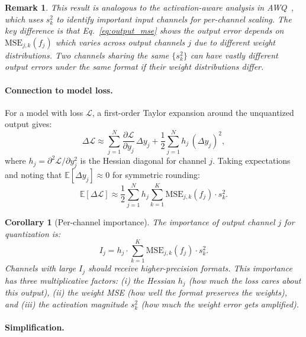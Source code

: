 \documentclass{article}
\newtheorem{corollary}{Corollary}
\newtheorem{remark}{Remark}
\begin{document}
\begin{remark}
This result is analogous to the activation-aware analysis in AWQ~\cite{lin2024awq}, which uses $s_k^2$ to identify important \emph{input} channels for per-channel scaling.
The key difference is that Eq.~\eqref{eq:output_mse} shows the output error depends on $\text{MSE}_{j,k}(f_j)$ which varies across \emph{output} channels $j$ due to different weight distributions.
Two channels sharing the same $\{s_k^2\}$ can have vastly different output errors under the same format if their weight distributions differ.
\end{remark}

\paragraph{Connection to model loss.}
For a model with loss $\mathcal{L}$, a first-order Taylor expansion around the unquantized output gives:
\begin{equation}
\label{eq:loss_expansion}
\Delta\mathcal{L} \approx \sum_{j=1}^N \frac{\partial \mathcal{L}}{\partial y_j}\,\Delta y_j + \frac{1}{2}\sum_{j=1}^N h_j\,(\Delta y_j)^2,
\end{equation}
where $h_j = \partial^2\mathcal{L}/\partial y_j^2$ is the Hessian diagonal for channel $j$.
Taking expectations and noting that $\mathbb{E}[\Delta y_j] \approx 0$ for symmetric rounding:
\begin{equation}
\label{eq:expected_loss}
\mathbb{E}[\Delta\mathcal{L}] \approx \frac{1}{2}\sum_{j=1}^N h_j \sum_{k=1}^K \text{MSE}_{j,k}(f_j) \cdot s_k^2.
\end{equation}

\begin{corollary}[Per-channel importance]
\label{cor:importance}
The importance of output channel $j$ for quantization is:
\begin{equation}
\label{eq:importance}
I_j = h_j \cdot \sum_{k=1}^K \text{MSE}_{j,k}(f_j) \cdot s_k^2.
\end{equation}
Channels with large $I_j$ should receive higher-precision formats.
This importance has three multiplicative factors: (i) the Hessian $h_j$ (how much the loss cares about this output), (ii) the weight MSE (how well the format preserves the weights), and (iii) the activation magnitude $s_k^2$ (how much the weight error gets amplified).
\end{corollary}

\paragraph{Simplification.}
\end{document}
